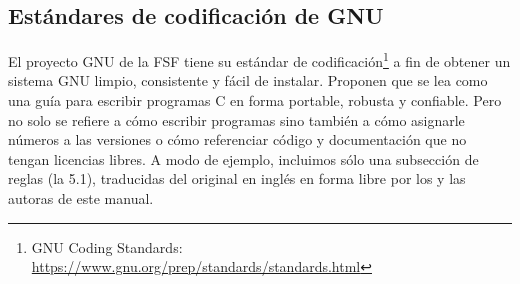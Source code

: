 %
%
%
%
%
%
%
%
%
%
%
%
%
%
%

\subsection{Estándares de codificación de GNU}

El proyecto GNU de la FSF tiene su estándar de codificación\footnote{GNU Coding Standards: \url{https://www.gnu.org/prep/standards/standards.html}} a fin de obtener un sistema GNU limpio, consistente y fácil de instalar. Proponen que se lea como una guía para escribir programas C en forma portable, robusta y confiable. Pero no solo se refiere a cómo escribir programas sino también a cómo asignarle números a las versiones o cómo referenciar código y documentación que no tengan licencias libres. A modo de ejemplo, incluimos sólo una subsección de reglas (la 5.1), traducidas del original en inglés en forma libre por los y las autoras de este manual.

